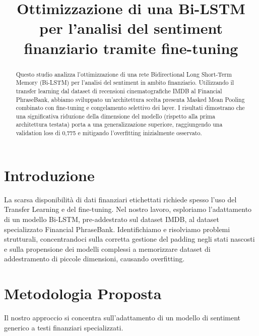 \documentclass[conference]{IEEEtran}
\begin{document}
\title{Ottimizzazione di una Bi-LSTM per l'analisi del sentiment finanziario tramite fine-tuning}

\author{
    \and
}

\maketitle

\begin{abstract}
    Questo studio analizza l'ottimizzazione di una rete Bidirectional Long Short-Term Memory (Bi-LSTM) per l'analisi del sentiment in ambito finanziario. Utilizzando il transfer learning dal dataset di recensioni cinematografiche IMDB al Financial PhraseBank, abbiamo sviluppato un'architettura scelta presenta Masked Mean Pooling combinato con fine-tuning e congelamento selettivo dei layer. I risultati dimostrano che una significativa riduzione della dimensione del modello (rispetto alla prima architettura testata) porta a una generalizzazione superiore, raggiungendo una validation loss di 0,775 e mitigando l'overfitting inizialmente osservato.
\end{abstract}

\section{Introduzione}
La scarsa disponibilità di dati finanziari etichettati richiede spesso l'uso del Transfer Learning e del fine-tuning. Nel nostro lavoro, esploriamo l'adattamento di un modello Bi-LSTM, pre-addestrato sul dataset IMDB, al dataset specializzato Financial PhraseBank. Identifichiamo e risolviamo problemi strutturali, concentrandoci sulla corretta gestione del padding negli stati nascosti e sulla propensione dei modelli complessi a memorizzare dataset di addestramento di piccole dimensioni, causando overfitting.

\section{Metodologia Proposta}
Il nostro approccio si concentra sull'adattamento di un modello di sentiment generico a testi finanziari specializzati.
\end{document}
